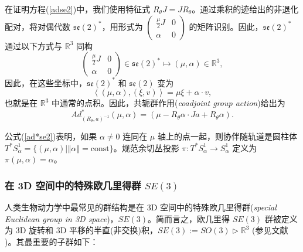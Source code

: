 \documentclass[11pt,fontset=founder]{ctexart}
\begin{document}
在证明方程(\ref{adse2})中，我们使用特征式 $R_{\theta }J=JR_{\theta }$。通过乘积的迹给出的非退化配对，将对偶代数 $\mathfrak{se}(2)^{\ast }$，用形式为 $\left(
\begin{array}{cc}
\frac{\mu }{2}J & 0 \\
\alpha & 0%
\end{array}%
\right)$ 的矩阵识别。因此，$\mathfrak{se}(2)^{\ast }$ 通过以下方式与 $\mathbb{R}^{3}$ 同构%
\begin{equation*}
\left(
\begin{array}{cc}
\frac{\mu }{2}J & 0 \\
\alpha & 0%
\end{array}%
\right) \in \mathfrak{se}(2)^{\ast }\longmapsto (\mu ,\alpha )\in \mathbb{R}%
^{3},
\end{equation*}%
因此，在这些坐标中，$\mathfrak{se}(2)^{\ast }$ 和 $\mathfrak{se}(2)$ 变为%
\begin{equation*}
\left\langle (\mu ,\alpha ),(\xi ,v)\right\rangle =\mu \xi +\alpha \cdot v,
\end{equation*}%
也就是在 $\mathbb{R}^{3}$ 中通常的点积。因此，共轭群作用(\emph{coadjoint group action})给出为%
\begin{equation}
Ad_{\left( R_{\theta },a\right) ^{-1}}^{\ast }(\mu ,\alpha )=(\mu -R_{\theta
}\alpha \cdot Ja+R_{\theta }\alpha ).  \label{ad*se2}
\end{equation}

公式(\ref{ad*se2})表明，如果 $\alpha \neq 0$ 连同在 $\mu$ 轴上的点一起，则协伴随轨道是圆柱体 $T^{\ast }S_{\alpha }^{1}=\{(\mu ,\alpha )|\left\Vert \alpha \right\Vert=\text{const}\}$。规范余切丛投影 $\pi :T^{\ast }S_{\alpha
}^{1}\rightarrow S_{\alpha }^{1}$ 定义为 $\pi (\mu ,\alpha )=\alpha$。

\subsubsection{在 3D 空间中的特殊欧几里得群 $SE(3)$}

\label{SE(3)}

人类生物动力学中最常见的群结构是在 3D 空间中的特殊欧几里得群(\emph{special Euclidean group in 3D space})，$SE(3)$。简而言之，欧几里得 $SE(3)$ 群被定义为 3D 旋转和 3D 平移的半直(非交换)积，$SE(3):=SO(3)\rhd \mathbb{R}^{3}$ (参见文献 \cite{Marsden,GaneshSprBig,GaneshADG})。其最重要的子群如下：\newline
\end{document}
